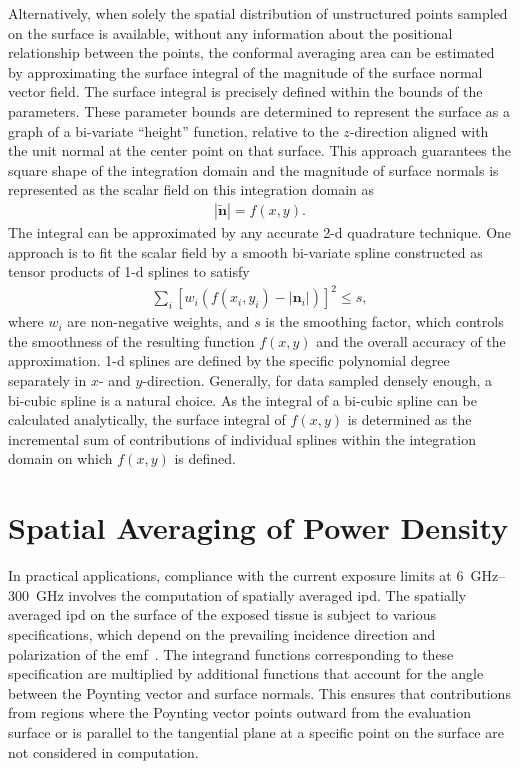 Alternatively, when solely the spatial distribution of unstructured points sampled on the surface is available, without any information about the positional relationship between the points, the conformal averaging area can be estimated by approximating the surface integral of the magnitude of the surface normal vector field.
The surface integral is precisely defined within the bounds of the parameters. 
These parameter bounds are determined to represent the surface as a graph of a bi-variate ``height'' function, relative to the $z$-direction aligned with the unit normal at the center point on that surface.
This approach guarantees the square shape of the integration domain and the magnitude of surface normals is represented as the scalar field on this integration domain as
\begin{align}
    \left| \mathbf{\tilde n} \right| = f(x, y).
\end{align}
The integral can be approximated by any accurate \gls{2-d} quadrature technique.
One approach is to fit the scalar field by a smooth bi-variate spline constructed as tensor products of \gls{1-d} splines to satisfy
\begin{align}
    \sum_{i} \left[ w_i \left( f(x_i, y_i) - \left| \mathbf{n}_i \right| \right) \right]^2 \leq s,
\end{align}
where $w_i$ are non-negative weights, and $s$ is the smoothing factor, which controls the smoothness of the resulting function $f(x, y)$ and the overall accuracy of the approximation. 
\Gls{1-d} splines are defined by the specific polynomial degree separately in $x$- and $y$-direction.
Generally, for data sampled densely enough, a bi-cubic spline is a natural choice.
As the integral of a bi-cubic spline can be calculated analytically, the surface integral of $f(x, y)$ is determined as the incremental sum of contributions of individual splines within the integration domain on which $f(x, y)$ is defined.

\section{Spatial Averaging of Power Density}
\label{sec:spatial_averaging_of_power_density}
In practical applications, compliance with the current exposure limits at \SIrange{6}{300}{\GHz} involves the computation of spatially averaged \gls{ipd}.
The spatially averaged \gls{ipd} on the surface of the exposed tissue is subject to various specifications, which depend on the prevailing incidence direction and polarization of the \gls{emf}~\cite{IEC63195-2-2022}.
The integrand functions corresponding to these specification are multiplied by additional functions that account for the angle between the Poynting vector and surface normals.
This ensures that contributions from regions where the Poynting vector points outward from the evaluation surface or is parallel to the tangential plane at a specific point on the surface are not considered in computation.

